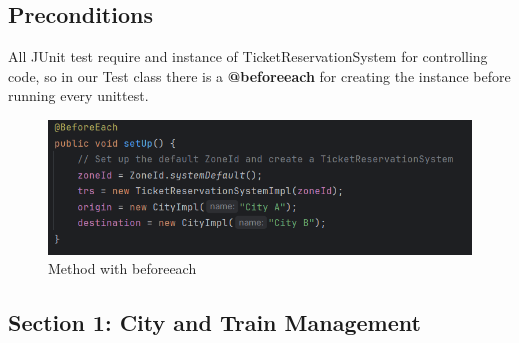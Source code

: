 \documentclass{article}
\begin{document}
 \subsection{Preconditions}
 All JUnit test require and instance of TicketReservationSystem for controlling code, so in our Test class there is a \textbf{@beforeeach} for creating the instance before running every unittest.

 \bigskip

\begin{figure}[h]
  \centering
  \includegraphics[width=1.0\textwidth]{pictures/T-B.png}
  \caption{Method with beforeeach}
  \label{fig:your_label}
\end{figure}

\pagebreak

\subsection{Section 1: City and Train Management}
\end{document}
